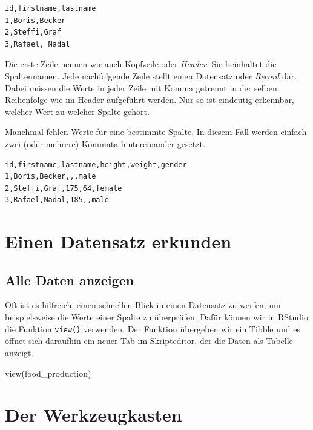 \documentclass[
]{book}
\newenvironment{Shaded}{\begin{snugshade}}{\end{snugshade}}
\newcommand{\FunctionTok}[1]{\textcolor[rgb]{0.00,0.00,0.00}{#1}}
\newcommand{\NormalTok}[1]{#1}
\begin{document}
\begin{verbatim}
id,firstname,lastname
1,Boris,Becker
2,Steffi,Graf
3,Rafael, Nadal
\end{verbatim}

Die erste Zeile nennen wir auch Kopfzeile oder \emph{Header}. Sie beinhaltet die Spaltennamen. Jede nachfolgende Zeile stellt einen Datensatz oder \emph{Record} dar. Dabei müssen die Werte in jeder Zeile mit Komma getrennt in der selben Reihenfolge wie im Header aufgeführt werden. Nur so ist eindeutig erkennbar, welcher Wert zu welcher Spalte gehört.

Manchmal fehlen Werte für eine bestimmte Spalte. In diesem Fall werden einfach zwei (oder mehrere) Kommata hintereinander gesetzt.

\begin{verbatim}
id,firstname,lastname,height,weight,gender
1,Boris,Becker,,,male
2,Steffi,Graf,175,64,female
3,Rafael,Nadal,185,,male
\end{verbatim}

\hypertarget{einen-datensatz-erkunden}{%
\chapter{Einen Datensatz erkunden}\label{einen-datensatz-erkunden}}

\hypertarget{alle-daten-anzeigen}{%
\section{Alle Daten anzeigen}\label{alle-daten-anzeigen}}

Oft ist es hilfreich, einen schnellen Blick in einen Datensatz zu werfen, um beispielsweise die Werte einer Spalte zu überprüfen. Dafür können wir in RStudio die Funktion \texttt{view()} verwenden. Der Funktion übergeben wir ein Tibble und es öffnet sich daraufhin ein neuer Tab im Skripteditor, der die Daten als Tabelle anzeigt.

\begin{Shaded}
\begin{Highlighting}[]
\FunctionTok{view}\NormalTok{(food\_production)}
\end{Highlighting}
\end{Shaded}

\hypertarget{der-werkzeugkasten}{%
\chapter{Der Werkzeugkasten}\label{der-werkzeugkasten}}
\end{document}
